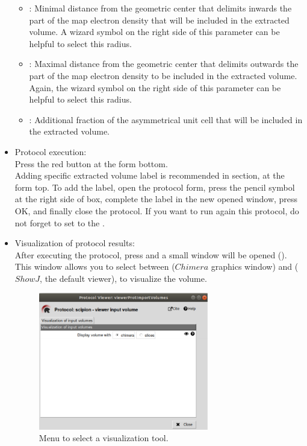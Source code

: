 \begin{itemize}
\begin{itemize}
  \item {}: Minimal distance from the geometric center that delimits inwards the part of the map electron density that will be included in the extracted volume. A wizard symbol on the right side of this parameter can be helpful to select this radius.\\
  \item {}: Maximal distance from the geometric center that delimits outwards the part of the map electron density to be included in the extracted volume. Again, the wizard symbol on the right side of this parameter can be helpful to select this radius.\\
  \item {}: Additional fraction of the asymmetrical unit cell that will be included in the extracted volume.\\
  \end{itemize}

  \item Protocol execution:\\
  
  Press the  red button at the form bottom.\\
  Adding specific extracted volume label is recommended in  section, at the form top. To add the label, open the protocol form, press the pencil symbol at the right side of  box, complete the label in the new opened window, press OK, and finally close the protocol. If you want to run again this protocol, do not forget to set to  the .\\
  
  \item Visualization of protocol results:\\
  
  After executing the protocol, press  and a small window will be opened (). This window allows you to select between  ($Chimera$ graphics window) and  ($ShowJ$, the default \scipion viewer), to visualize the volume.
  
    \begin{figure}[H]
    \centering 
    \captionsetup{width=.7\linewidth} 
    \includegraphics[width=0.70\textwidth]{Images_appendix/Fig101.pdf}
    \caption{Menu to select a visualization tool.}
    \label{fig:app_protocol_volume_2}
   \end{figure}
   

\end{itemize}
